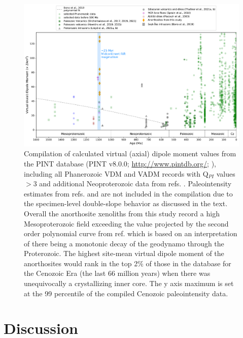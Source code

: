 \documentclass[9pt,twocolumn,twoside,lineno]{pnas-new}
\begin{document}
\begin{figure}[h!]
\noindent\includegraphics[width=17.8 cm]{PINT_compilation.pdf}
\centering
\caption{\footnotesize{Compilation of calculated virtual (axial) dipole moment values from the PINT database (PINT v8.0.0; \url{http://www.pintdb.org/}; \citealp{Bono2021a}), including all Phanerozoic VDM and VADM records with Q$_{PI}$ values $>$3 and additional Neoproterozoic data from refs. \citealp{Lloyd2021a, Lloyd2021b, Thallner2021a, Thallner2021b}. Paleointensity estimates from refs. \citealp{Pesonen1983a} and \citealp{Kulakov2013a} are not included in the compilation due to the specimen-level double-slope behavior as discussed in the text. Overall the anorthosite xenoliths from this study record a high Mesoproterozoic field exceeding the value projected by the second order polynomial curve from ref. \citealp{Bono2019a} which is based on an interpretation of there being a monotonic decay of the geodynamo through the Proterozoic. The highest site-mean virtual dipole moment of the anorthosites would rank in the top 2$\%$ of those in the database for the Cenozoic Era (the last 66 million years) when there was unequivocally a crystallizing inner core. The y axis maximum is set at the 99 percentile of the compiled Cenozoic paleointensity data.}}
\label{fig:PINT_compilation}
\end{figure}

\section*{Discussion}
\end{document}
